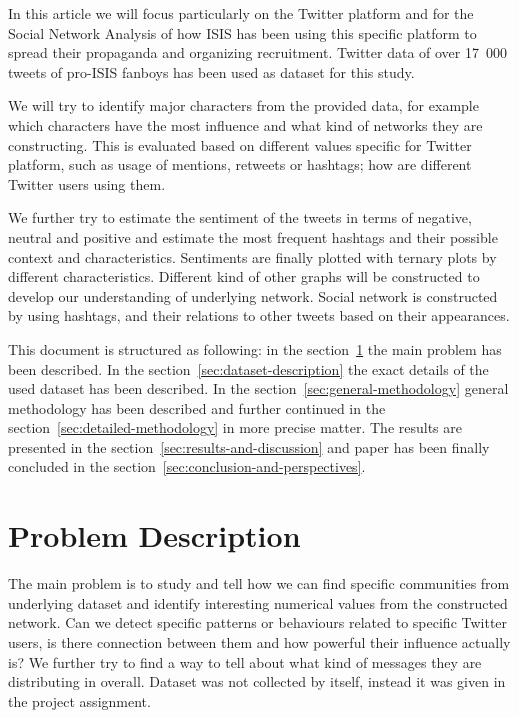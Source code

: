 \documentclass[conference]{IEEEtran}
\begin{document}
    In this article we will focus particularly on the Twitter platform and for the Social Network Analysis of how ISIS has been using this specific
    platform to spread their propaganda and organizing recruitment.
    Twitter data of over 17~000 tweets of pro-ISIS fanboys has been used as dataset for this study.

    We will try to identify major characters from the provided data, for example which characters have the most influence and
    what kind of networks they are constructing.
    This is evaluated based on different values specific for Twitter platform, such as usage of mentions, retweets or hashtags; how are different Twitter users using them.

    We further try to estimate the sentiment of the tweets in terms of negative, neutral and positive and estimate the most
    frequent hashtags and their possible context and characteristics.
    Sentiments are finally plotted with ternary plots by different characteristics.
    Different kind of other graphs will be constructed to develop our understanding of underlying network.
    Social network is constructed by using hashtags, and their relations to other tweets based on their appearances.

    This document is structured as following: in the section~\ref{sec:problem-description} the main problem has been described.
    In the section~\ref{sec:dataset-description} the exact details of the used dataset has been described.
    In the section~\ref{sec:general-methodology} general methodology has been described and further continued in the section~\ref{sec:detailed-methodology}
    in more precise matter.
    The results are presented in the section~\ref{sec:results-and-discussion} and paper has been finally concluded in the section~\ref{sec:conclusion-and-perspectives}.


    \section{Problem Description}\label{sec:problem-description}

    The main problem is to study and tell how we can find specific communities from underlying dataset and identify interesting
    numerical values from the constructed network.
    Can we detect specific patterns or behaviours related to specific Twitter users, is there connection between them and how powerful their influence actually is?
    We further try to find a way to tell about what kind of messages they are distributing in overall.
    Dataset was not collected by itself, instead it was given in the project assignment.
\end{document}
